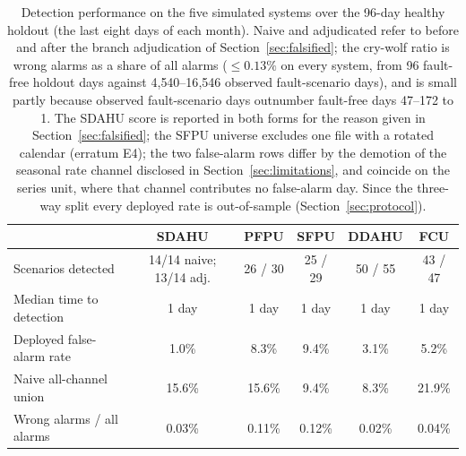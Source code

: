 \documentclass[11pt,letterpaper]{article}
\begin{document}
\begin{table}[htbp]
\centering
\caption{Detection performance on the five simulated systems over the 96-day healthy holdout (the last eight days of each month). Naive and adjudicated refer to before and after the branch adjudication of Section~\ref{sec:falsified}; the cry-wolf ratio is wrong alarms as a share of all alarms ($\leq 0.13\%$ on every system, from 96 fault-free holdout days against 4{,}540--16{,}546 observed fault-scenario days), and is small partly because observed fault-scenario days outnumber fault-free days 47--172 to 1. The SDAHU score is reported in both forms for the reason given in Section~\ref{sec:falsified}; the SFPU universe excludes one file with a rotated calendar (erratum E4); the two false-alarm rows differ by the demotion of the seasonal rate channel disclosed in Section~\ref{sec:limitations}, and coincide on the series unit, where that channel contributes no false-alarm day. Since the three-way split every deployed rate is out-of-sample (Section~\ref{sec:protocol}).}
\label{tab:results}
\begin{tabular}{lccccc}
\hline
 & SDAHU & PFPU & SFPU & DDAHU & FCU \\
\hline
Scenarios detected & 14/14 naive; 13/14 adj. & 26 / 30 & 25 / 29 & 50 / 55 & 43 / 47 \\
Median time to detection & 1 day & 1 day & 1 day & 1 day & 1 day \\
Deployed false-alarm rate & 1.0\% & 8.3\% & 9.4\% & 3.1\% & 5.2\% \\
Naive all-channel union & 15.6\% & 15.6\% & 9.4\% & 8.3\% & 21.9\% \\
Wrong alarms / all alarms & 0.03\% & 0.11\% & 0.12\% & 0.02\% & 0.04\% \\
\hline
\end{tabular}

\end{table}
\end{document}
